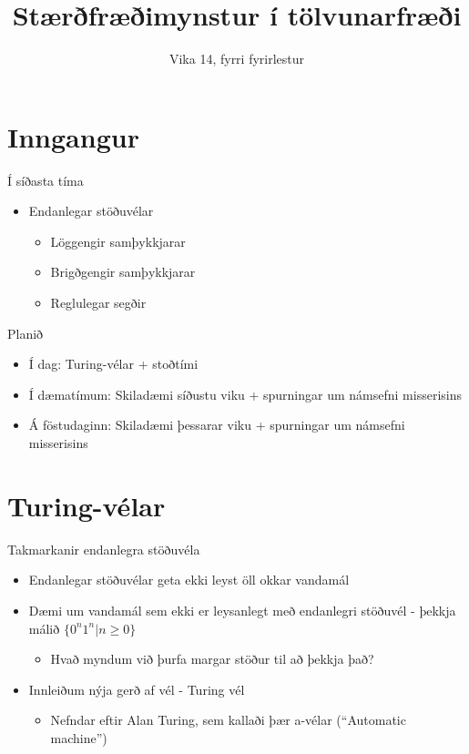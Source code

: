 \documentclass[handout]{beamer}
\title{Stærðfræðimynstur í tölvunarfræði}
\subtitle{Vika 14, fyrri fyrirlestur}
\begin{document}
\begin{frame}
\titlepage
\end{frame}


\section{Inngangur}

\begin{frame}{Í síðasta tíma}
\begin{itemize}
 \item Endanlegar stöðuvélar
 \begin{itemize}
  \item Löggengir samþykkjarar
  \item Brigðgengir samþykkjarar
  \item Reglulegar segðir
 \end{itemize}
\end{itemize}
\end{frame}

\begin{frame}{Planið}
\begin{itemize}
 \item Í dag: Turing-vélar + stoðtími
 \item Í dæmatímum: Skiladæmi síðustu viku + spurningar um námsefni misserisins
 \item Á föstudaginn: Skiladæmi þessarar viku + spurningar um námsefni misserisins
\end{itemize}
\end{frame}

\section{Turing-vélar}

\begin{frame}{Takmarkanir endanlegra stöðuvéla}
\begin{itemize}
 \item Endanlegar stöðuvélar geta ekki leyst öll okkar vandamál
 \item Dæmi um vandamál sem ekki er leysanlegt með endanlegri stöðuvél - þekkja málið $\{0^n1^n | n\geq 0\}$
 \begin{itemize}
  \item Hvað myndum við þurfa margar stöður til að þekkja það?
 \end{itemize}
 \item Innleiðum nýja gerð af vél - Turing vél
 \begin{itemize}
  \item Nefndar eftir Alan Turing, sem kallaði þær a-vélar (``Automatic machine'')
 \end{itemize}
\end{itemize}
\end{frame}
\end{document}
